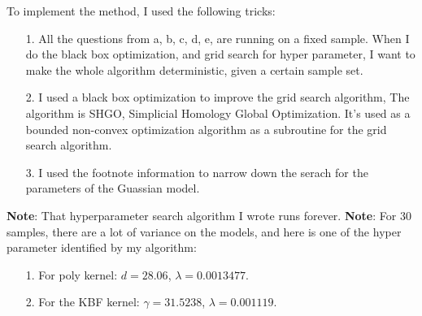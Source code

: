 \documentclass[]{article}
\begin{document}
        To implement the method, I used the following tricks: 
        \begin{enumerate}
            \item[1.] All the questions from a, b, c, d, e, are running on a fixed sample. When I do the black box optimization, and grid search for hyper parameter, I want to make the whole algorithm deterministic, given a certain sample set. 
            \item[2.] I used a black box optimization to improve the grid search algorithm, The algorithm is SHGO, Simplicial Homology Global Optimization. It's used as a bounded non-convex optimization algorithm as a subroutine for the grid search algorithm.  
            \item[3.] I used the footnote information to narrow down the serach for the parameters of the Guassian model.  
        \end{enumerate}
        \textbf{Note}: That hyperparameter search algorithm I wrote runs forever. 
        \textbf{Note}: For 30 samples, there are a lot of variance on the models, and here is one of the hyper parameter identified by my algorithm: 
        \begin{enumerate}
            \item [1.] For poly kernel: $d = 28.06$, $\lambda = 0.0013477$. 
            \item [2.] For the KBF kernel: $\gamma = 31.5238$, $\lambda = 0.001119$. 
        \end{enumerate}
\end{document}
